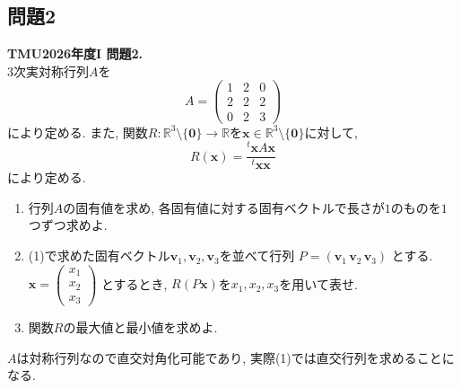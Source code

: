 \documentclass[titlepage]{jsarticle}
\numberwithin{equation}{section}
\begin{document}
\subsection{問題2}
\begin{problem}
\textbf{TMU2026年度I 問題2.}\\
$3$次実対称行列$A$を
\[
A=
\begin{pmatrix}
1 & 2 & 0\\
2 & 2 & 2\\
0 & 2 & 3
\end{pmatrix}
\]
により定める. また, 関数$R\colon\mathbb{R}^3\setminus\{\bm{0}\}\to\mathbb{R}$を$\bm{x}\in\mathbb{R}^3\setminus\{\bm{0}\}$に対して,
\[
R(\bm{x})=\frac{{}^t\bm{x}A\bm{x}}{{}^t\bm{x}\bm{x}}
\]
により定める. 

\begin{enumerate}[label=(\arabic*)]
    \item 行列$A$の固有値を求め, 各固有値に対する固有ベクトルで長さが$1$のものを$1$つずつ求めよ.

    \item (1)で求めた固有ベクトル$\bm{v}_1, \bm{v}_2, \bm{v}_3$を並べて行列
    $
    P=(\bm{v}_1\,\bm{v}_2\,\bm{v}_3)
    $
    とする. 
    $
    \bm{x}=
    \begin{pmatrix}
    x_1\\
    x_2\\
    x_3
    \end{pmatrix}
    $
    とするとき, $R(P\bm{x})$を$x_1,x_2,x_3$を用いて表せ.

    \item 関数$R$の最大値と最小値を求めよ.
\end{enumerate}
\end{problem}
$A$は対称行列なので直交対角化可能であり, 実際(1)では直交行列を求めることになる.
\end{document}
